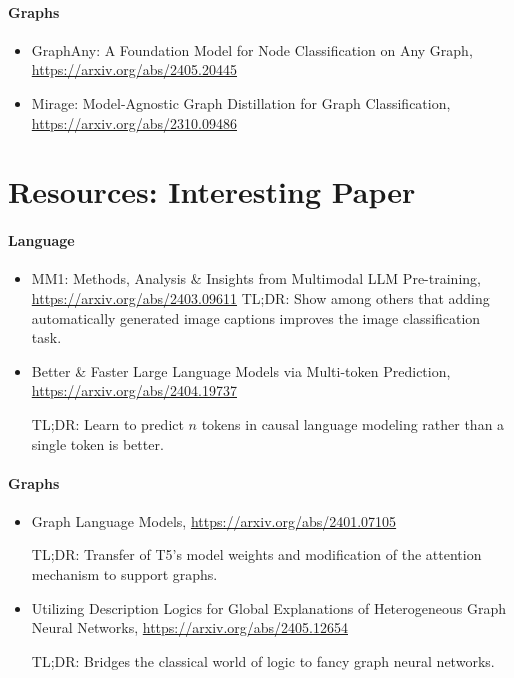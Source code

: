 \paragraph{Graphs}

\begin{itemize}

\item GraphAny: A Foundation Model for Node Classification on Any Graph, \url{https://arxiv.org/abs/2405.20445}

\item Mirage: Model-Agnostic Graph Distillation for Graph Classification, \url{https://arxiv.org/abs/2310.09486}
\end{itemize}


\section{Resources: Interesting Paper}

\paragraph{Language}

\begin{itemize}

\item MM1: Methods, Analysis \& Insights from Multimodal LLM Pre-training,
\url{https://arxiv.org/abs/2403.09611} 
\newline
TL;DR: Show among others that adding automatically generated image captions improves the image classification task.

\item Better \& Faster Large Language Models via Multi-token Prediction, 
\url{https://arxiv.org/abs/2404.19737}

TL;DR: Learn to predict $n$ tokens in causal language modeling rather than a single token is better.

\end{itemize}

\paragraph{Graphs}

\begin{itemize}

\item Graph Language Models,
\url{https://arxiv.org/abs/2401.07105}

TL;DR: Transfer of T5's model weights and modification of the attention mechanism to support graphs.

\item Utilizing Description Logics for Global Explanations of Heterogeneous Graph Neural Networks, \url{https://arxiv.org/abs/2405.12654}

TL;DR: Bridges the classical world of logic to fancy graph neural networks.

\end{itemize}


